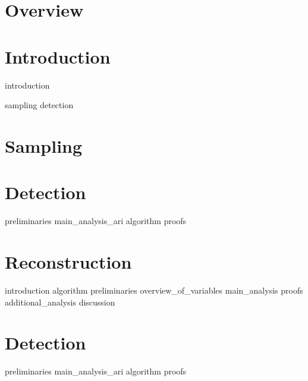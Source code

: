 \documentclass[a4paper, openany, oneside]{memoir}
\begin{document}
\chapter{Overview}

\chapter{Introduction}
{introduction}

{sampling}
{detection}


\chapter{Sampling}

\chapter{Detection}

{preliminaries}
{main_analysis_ari}
{algorithm}
{proofs}

\chapter{Reconstruction}

{introduction}
{algorithm}
{preliminaries}
{overview_of_variables}
{main_analysis}
{proofs}
{additional_analysis}
{discussion}

\chapter{Detection}

{preliminaries}
{main_analysis_ari}
{algorithm}
{proofs}
\end{document}
